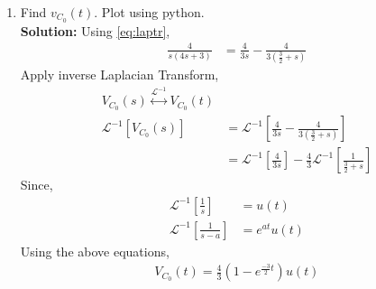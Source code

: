 \documentclass[journal,12pt,twocolumn]{IEEEtran}
\newcommand{\solution}{\noindent \textbf{Solution: }}
\providecommand{\brak}[1]{\ensuremath{\left(#1\right)}}
\providecommand{\system}[1]{\overset{\mathcal{#1}}{ \longleftrightarrow}}
\providecommand{\laplaceinv}[1]{{\mathcal{L}^{-1}\ensuremath{\left[#1\right]}}}
\numberwithin{equation}{section}
\renewcommand\thesection{\arabic{section}}
\begin{document}
\begin{enumerate}[label=\arabic*.,ref=\thesection.\theenumi]
\begin{figure}[!ht]
			\caption{}
			\label{fig:lap-ckt}
\end{figure}
		where 
		\begin{align}
			u(t) \system{L} V_1(s)
			\\
			2u(t) \system{L} V_2(s)
		\end{align}
		Find the voltage across the capacitor $V_{C_0}(s)$.\\
		\solution
		\begin{align}
		R_{eff}=\frac{\frac{2}{2}+\frac{1}{1}}{1+\frac{1}{2}}
		=\frac{4}{3} \Omega\\
		V_{eff}=\frac{1}{1+\frac{1}{2}}
		=\frac{2}{3}V
		\end{align}
\begin{align}
V_{C_0}(s)&=V_{S}(s)\frac{C_{0}}{C_{0}+R_{eff}}\\
&=\brak{\frac{4}{3s}}\brak{\frac{\frac{1}{s}}{\frac{1}{s}+\frac{4}{3}}}\\
\label{eq:laptr}
&=\frac{4}{s\brak{4s+3}}
\end{align}
	\item Find $v_{C_0}(t)$.  Plot using python.\\
	\solution Using \eqref{eq:laptr},
	\begin{align}
	\frac{4}{s\brak{4s+3}}&=\frac{4}{3s}-\frac{4}{3(\frac{3}{2}+s)}
	\end{align}
	Apply inverse Laplacian Transform,
	\begin{align}
	V_{C_0}(s)\system{L^{-1}}V_{C_0}(t)\\
	\laplaceinv{V_{C_0}(s)}&=\laplaceinv{\frac{4}{3s}-\frac{4}{3(\frac{3}{2}+s)}}\\
&=	\laplaceinv{\frac{4}{3s}}-\frac{4}{3}\laplaceinv{\frac{1}{\frac{3}{2}+s}}
\end{align}
Since,
\begin{align}
\laplaceinv{\frac1s}&=u(t)\\
\laplaceinv{\frac{1}{s-a}}&=e^{at}u(t)
\end{align}
Using the above equations,
\begin{align}
V_{C_0}(t)=\frac{4}{3}\brak{ 1-e^{\frac{-3}{2} t}}u(t)
	\end{align}
	\begin{figure}[!ht]
			\centering

\end{figure}
\end{enumerate}
\end{document}
